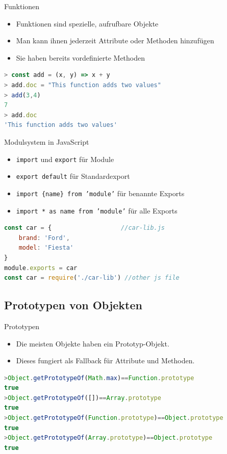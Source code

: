 \begin{definition}{Funktionen}
    \begin{itemize}
        \item Funktionen sind spezielle, aufrufbare Objekte
        \item Man kann ihnen jederzeit Attribute oder Methoden hinzufügen
        \item Sie haben bereits vordefinierte Methoden
      \end{itemize}
\begin{lstlisting}[language=JavaScript, style=basesmol]
> const add = (x, y) => x + y
> add.doc = "This function adds two values"
> add(3,4)
7
> add.doc
'This function adds two values'
\end{lstlisting}
\end{definition}

\begin{concept}{Modulsystem in JavaScript}
    \begin{itemize}
        \item \texttt{import} und \texttt{export} für Module
        \item \texttt{export default} für Standardexport
        \item \texttt{import \{name\} from 'module'} für benannte Exports
        \item \texttt{import * as name from 'module'} für alle Exports
    \end{itemize}
\begin{lstlisting}[language=JavaScript, style=basesmol]
const car = {                   //car-lib.js
    brand: 'Ford',
    model: 'Fiesta'
}
module.exports = car
const car = require('./car-lib') //other js file
\end{lstlisting}
\end{concept}

\subsection{Prototypen von Objekten}

\begin{definition}{Prototypen}
    \begin{itemize}
        \item Die meisten Objekte haben ein Prototyp-Objekt.
        \item Dieses fungiert als Fallback für Attribute und Methoden.
      \end{itemize}
\begin{lstlisting}[language=JavaScript, style=basesmol, numbers=none, xleftmargin=-2pt]
>Object.getPrototypeOf(Math.max)==Function.prototype
true
>Object.getPrototypeOf([])==Array.prototype
true
>Object.getPrototypeOf(Function.prototype)==Object.prototype
true
>Object.getPrototypeOf(Array.prototype)==Object.prototype
true
\end{lstlisting}
\end{definition}

